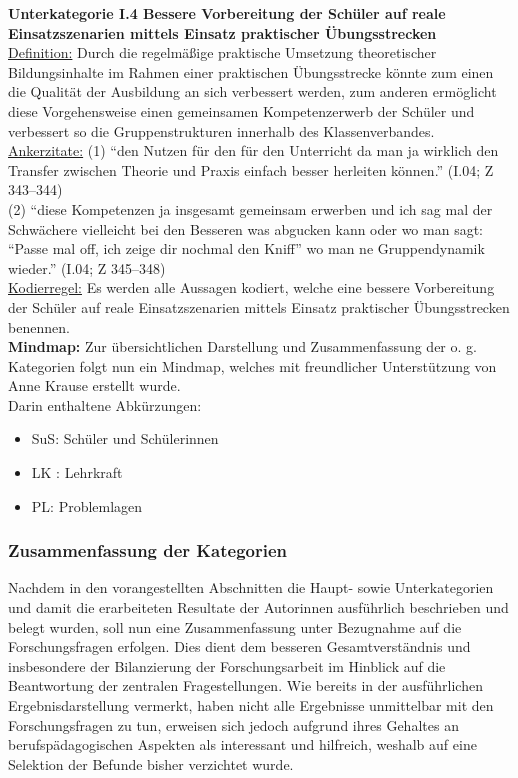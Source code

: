 \noindent
\textbf{Unterkategorie I.4 Bessere Vorbereitung der Schüler auf reale Einsatzszenarien mittels Einsatz praktischer Übungsstrecken}\\
\underline{Definition:} Durch die regelmäßige praktische Umsetzung theoretischer Bildungsinhalte im Rahmen einer praktischen Übungsstrecke könnte zum einen die Qualität der Ausbildung an sich verbessert werden, zum anderen ermöglicht diese Vorgehensweise einen gemeinsamen Kompetenzerwerb der Schüler und verbessert so die Gruppenstrukturen innerhalb des Klassenverbandes.\\
\underline{Ankerzitate:} (1) "`den Nutzen für den für den Unterricht da man ja wirklich den Transfer zwischen Theorie und Praxis einfach besser herleiten können."' (I.04; Z 343--344)\\ (2) "`diese Kompetenzen ja insgesamt gemeinsam erwerben und ich sag mal der Schwächere vielleicht bei den Besseren was abgucken kann oder wo man sagt: "`Passe mal off, ich zeige dir nochmal den Kniff"' wo man ne Gruppendynamik wieder."' (I.04; Z 345--348)\\
\underline{Kodierregel:} Es werden alle Aussagen kodiert, welche eine bessere Vorbereitung der Schüler auf reale Einsatzszenarien mittels Einsatz praktischer Übungsstrecken benennen.\\

\noindent
\textbf{Mindmap:} Zur übersichtlichen Darstellung und Zusammenfassung der o. g. Kategorien folgt nun ein Mindmap, welches mit freundlicher Unterstützung von Anne Krause erstellt wurde.\\
\noindent
Darin enthaltene Abkürzungen:
\begin{itemize}
	\item SuS: Schüler und Schülerinnen
	\item LK : Lehrkraft
	\item PL: Problemlagen
\end{itemize}

\newpage


\subsubsection{Zusammenfassung der Kategorien}
\label{sec:ZusammenfassungDerKategorien}

Nachdem in den vorangestellten Abschnitten die Haupt- sowie Unterkategorien und damit die erarbeiteten Resultate der Autorinnen ausführlich beschrieben und belegt wurden, soll nun eine Zusammenfassung unter Bezugnahme auf die Forschungsfragen erfolgen. Dies dient dem besseren Gesamtverständnis und insbesondere der Bilanzierung der Forschungsarbeit im Hinblick auf die Beantwortung der zentralen Fragestellungen. Wie bereits in der ausführlichen Ergebnisdarstellung vermerkt, haben nicht alle Ergebnisse unmittelbar mit den Forschungsfragen zu tun, erweisen sich jedoch aufgrund ihres Gehaltes an berufspädagogischen Aspekten als interessant und hilfreich, weshalb auf eine Selektion der Befunde bisher verzichtet wurde.\\

